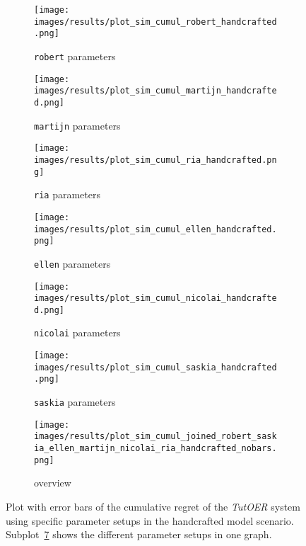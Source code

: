 \begin{figure}[ht]
	\begin{subfigure}{0.48\linewidth}
	\texttt{[image: images/results/plot\_sim\_cumul\_robert\_handcrafted.png]}
	\caption{\texttt{robert} parameters}
	\label{fig:cumul_handcrafted_robert}
	\end{subfigure}
	\hfill
	\begin{subfigure}{0.48\linewidth}
	\texttt{[image: images/results/plot\_sim\_cumul\_martijn\_handcrafted.png]}
	\caption{\texttt{martijn} parameters}
	\label{fig:cumul_handcrafted_martijn}
	\end{subfigure}
	\begin{subfigure}{0.48\linewidth}
	\texttt{[image: images/results/plot\_sim\_cumul\_ria\_handcrafted.png]}
	\caption{\texttt{ria} parameters}
	\label{fig:cumul_handcrafted_ria}
	\end{subfigure}
	\hfill
	\begin{subfigure}{0.48\linewidth}
	\texttt{[image: images/results/plot\_sim\_cumul\_ellen\_handcrafted.png]}
	\caption{\texttt{ellen} parameters}
	\label{fig:cumul_handcrafted_ellen}
	\end{subfigure}
	\begin{subfigure}{0.48\linewidth}
	\texttt{[image: images/results/plot\_sim\_cumul\_nicolai\_handcrafted.png]}
	\caption{\texttt{nicolai} parameters}
	\label{fig:cumul_handcrafted_nicolai}
	\end{subfigure}
	\hfill
	\begin{subfigure}{0.48\linewidth}
	\texttt{[image: images/results/plot\_sim\_cumul\_saskia\_handcrafted.png]}
	\caption{\texttt{saskia} parameters}
	\label{fig:cumul_handcrafted_saskia}
	\end{subfigure}
	\begin{subfigure}{\linewidth}
	\texttt{[image: images/results/plot\_sim\_cumul\_joined\_robert\_saskia\_ellen\_martijn\_nicolai\_ria\_handcrafted\_nobars.png]}
	\caption{overview}
	\label{fig:cumul_handcrafted_overview_group2}
	\end{subfigure}
	\caption{Plot with error bars of the cumulative regret of the \emph{TutOER}
	system using specific parameter setups in the handcrafted model scenario.
	Subplot~\ref{fig:cumul_handcrafted_overview_group2} shows the
	different parameter setups in one graph.}
	\label{fig:cumul_handcrafted_container_group2}
\end{figure}

